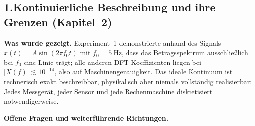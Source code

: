 ﻿\documentclass[12pt,a4paper,titlepage]{report}
\begin{document}
\subsection*{1.\enspace Kontinuierliche Beschreibung und ihre Grenzen
(Kapitel~2)}

\textbf{Was wurde gezeigt.}
Experiment~1 demonstrierte anhand des Signals
$x(t)=A\sin(2\pi f_0 t)$ mit $f_0=\SI{5}{\hertz}$, dass das
Betragsspektrum ausschließlich bei $f_0$ eine Linie trägt;
alle anderen DFT-Koeffizienten liegen bei $|X(f)|\lesssim10^{-14}$,
also auf Maschinengenauigkeit.
Das ideale Kontinuum ist rechnerisch exakt beschreibbar, physikalisch
aber niemals vollständig realisierbar: Jedes Messgerät, jeder Sensor
und jede Rechenmaschine diskretisiert notwendigerweise.

\textbf{Offene Fragen und weiterführende Richtungen.}
\end{document}
